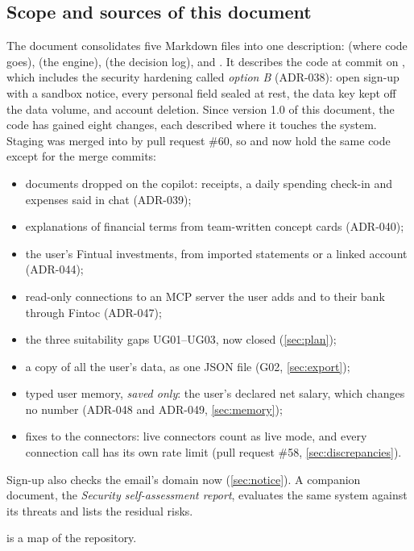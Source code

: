 \subsection{Scope and sources of this document}

The document consolidates five Markdown files into one description:  (where code goes),
 (the engine),  (the decision log),  and
. It describes the code at commit \texttt{\nlCommit} on \texttt{\nlBranch}, which includes the
security hardening called \emph{option B} (ADR-038): open sign-up with a sandbox notice, every personal field sealed
at rest, the data key kept off the data volume, and account deletion. Since version 1.0 of this document, the code
has gained eight changes, each described where it touches the system. Staging was merged into  by pull
request \#60, so  and  now hold the same code except for the merge commits:
\begin{itemize}
  \item documents dropped on the copilot: receipts, a daily spending check-in and expenses said in chat (ADR-039);
  \item explanations of financial terms from team-written concept cards (ADR-040);
  \item the user's Fintual investments, from imported statements or a linked account (ADR-044);
  \item read-only connections to an MCP server the user adds and to their bank through Fintoc (ADR-047);
  \item the three suitability gaps UG01--UG03, now closed (\cref{sec:plan});
  \item a copy of all the user's data, as one JSON file (G02, \cref{sec:export});
  \item typed user memory, \emph{saved only}: the user's declared net salary, which changes no number (ADR-048 and
    ADR-049, \cref{sec:memory});
  \item fixes to the connectors: live connectors count as live mode, and every connection call has its own rate limit
    (pull request \#58, \cref{sec:discrepancies}).
\end{itemize}
Sign-up also checks the email's domain now (\cref{sec:notice}). A companion document, the \emph{Security
self-assessment report}, evaluates the same system against its threats and lists the residual risks.

 is a map of the repository.

